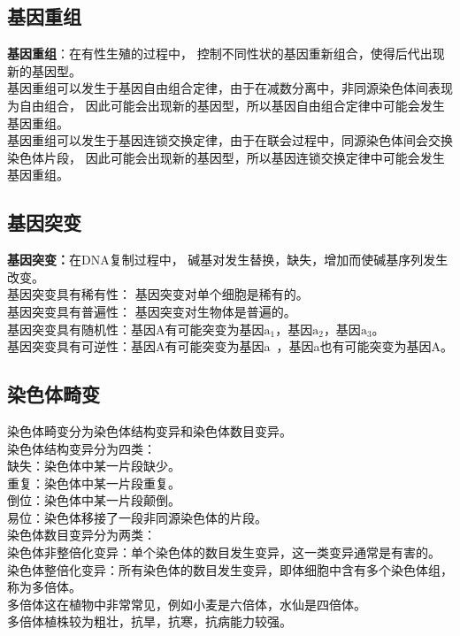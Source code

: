 \documentclass[UTF8]{ctexart}
\begin{document}
\subsection{基因重组}
    \textbf{基因重组}：在有性生殖的过程中，
    控制不同性状的基因重新组合，使得后代出现新的基因型。\\[3mm]
    基因重组可以发生于基因自由组合定律，由于在减数分离中，非同源染色体间表现为自由组合，
    因此可能会出现新的基因型，所以基因自由组合定律中可能会发生基因重组。\\[3mm]
    基因重组可以发生于基因连锁交换定律，由于在联会过程中，同源染色体间会交换染色体片段，
    因此可能会出现新的基因型，所以基因连锁交换定律中可能会发生基因重组。\\[3mm]

\subsection{基因突变}
    \textbf{基因突变：}在DNA复制过程中，
    碱基对发生替换，缺失，增加而使碱基序列发生改变。\\[3mm]
    基因突变具有稀有性：
    基因突变对单个细胞是稀有的。\\[2mm]
    基因突变具有普遍性：
    基因突变对生物体是普遍的。\\[2mm]
    基因突变具有随机性：基因A有可能突变为基因$\text{a}_\text{1}$，基因$\text{a}_\text{2}$，基因$\text{a}_\text{3}$。\\[2mm]
    基因突变具有可逆性：基因A有可能突变为基因a\,\,\,，基因a也有可能突变为基因A。\\

\subsection{染色体畸变}
    染色体畸变分为染色体结构变异和染色体数目变异。\\[6mm]
    染色体结构变异分为四类：\\[3mm]
    缺失：染色体中某一片段缺少。\\[3mm]
    重复：染色体中某一片段重复。\\[3mm]
    倒位：染色体中某一片段颠倒。\\[3mm]
    易位：染色体移接了一段非同源染色体的片段。\\[6mm]
    染色体数目变异分为两类：\\[3mm]
    染色体非整倍化变异：单个染色体的数目发生变异，这一类变异通常是有害的。\\[3mm]
    染色体整倍化变异：所有染色体的数目发生变异，即体细胞中含有多个染色体组，称为多倍体。\\[3mm]
    多倍体这在植物中非常常见，例如小麦是六倍体，水仙是四倍体。\\[3mm]
    多倍体植株较为粗壮，抗旱，抗寒，抗病能力较强。
\end{document}
